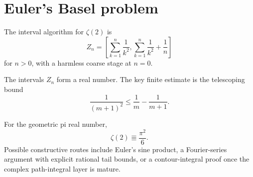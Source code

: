 \section{Euler's Basel problem}

\begin{definition}\label{def:zeta-two-raw}
The interval algorithm for \(\zeta(2)\) is
\[
  Z_n=
  \left[
    \sum_{k=1}^{n}\frac1{k^2},
    \sum_{k=1}^{n}\frac1{k^2}+\frac1n
  \right]
\]
for \(n>0\), with a harmless coarse stage at \(n=0\).
\end{definition}

\begin{theorem}\label{thm:zeta-two-valid}
\leanok
The intervals \(Z_n\) form a real number.  The key finite estimate is the
telescoping bound
\[
  \frac{1}{(m+1)^2}\le \frac1m-\frac1{m+1}.
\]
\end{theorem}

\begin{conjecture}\label{conj:basel}
For the geometric pi real number,
\[
  \zeta(2)\Equiv \frac{\pi^2}{6}.
\]
Possible constructive routes include Euler's sine product, a Fourier-series
argument with explicit rational tail bounds, or a contour-integral proof once
the complex path-integral layer is mature.
\end{conjecture}

